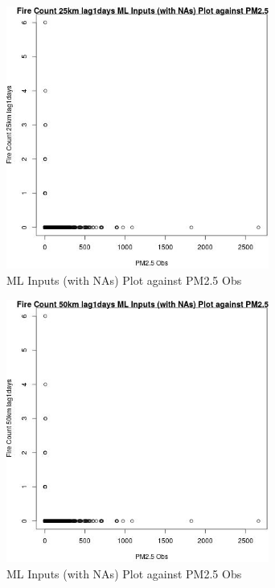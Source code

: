 \begin{figure} 
\centering  
\includegraphics[width=0.77\textwidth]{Code_Outputs/Report_ML_input_PM25_Step4_part_e_de_duplicated_aves_compiled_2019-05-20wNAs_Fire_Count_25km_lag1daysvPM25_Obs.jpg} 
\caption{\label{fig:Report_ML_input_PM25_Step4_part_e_de_duplicated_aves_compiled_2019-05-20wNAsFire_Count_25km_lag1daysvPM25_Obs}ML Inputs (with NAs) Plot against PM2.5 Obs} 
\end{figure} 
 

\begin{figure} 
\centering  
\includegraphics[width=0.77\textwidth]{Code_Outputs/Report_ML_input_PM25_Step4_part_e_de_duplicated_aves_compiled_2019-05-20wNAs_Fire_Count_50km_lag1daysvPM25_Obs.jpg} 
\caption{\label{fig:Report_ML_input_PM25_Step4_part_e_de_duplicated_aves_compiled_2019-05-20wNAsFire_Count_50km_lag1daysvPM25_Obs}ML Inputs (with NAs) Plot against PM2.5 Obs} 
\end{figure} 
 

